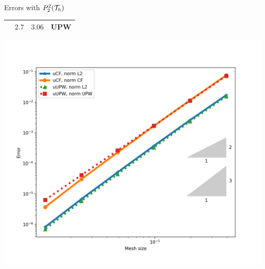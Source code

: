 \begin{frame}{Errors with $\relax{P}_2^2(\mathcal{T}_h)$}
\begin{minipage}{0.48\textwidth}
\begin{tabular}{|c|c|c|c|}
					& $2.7$ & $3.06$& UPW\\
					\hline
				\end{tabular}
		\end{minipage}
		\hspace*{0.35cm}
		\begin{minipage}{0.48\textwidth}
			\centering
			\includegraphics[scale=0.30]{img/Conveccion_Reaccion/errores_conveccion_reaccion_P2dc.png}
		\end{minipage}
		\end{frame}

